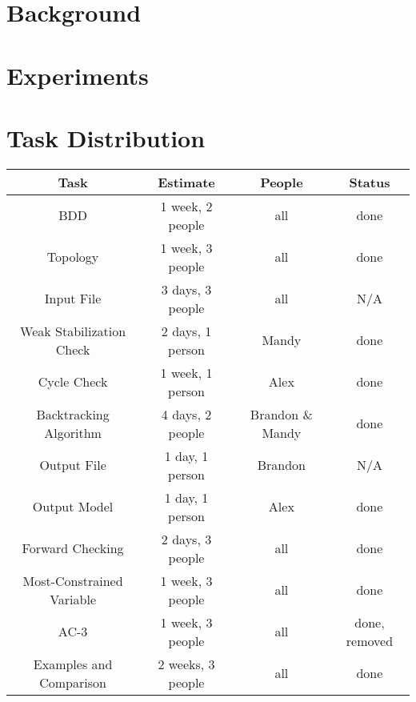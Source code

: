 
\section{Background}


\section{Experiments}

\section{Task Distribution}

\begin{center}
\begin{tabular}{|c||c|c|c|}
\hline
 Task & Estimate & People & Status \\
\hline
 BDD & 1 week, 2 people & all & done \\
 Topology & 1 week, 3 people & all & done \\
 Input File & 3 days, 3 people & all & N/A \\
 Weak Stabilization Check & 2 days, 1 person & Mandy & done \\
 Cycle Check & 1 week, 1 person & Alex & done \\
 Backtracking Algorithm & 4 days, 2 people & Brandon \& Mandy & done \\
 Output File & 1 day, 1 person &  Brandon & N/A \\
 Output Model & 1 day, 1 person & Alex & done \\
 Forward Checking & 2 days, 3 people & all & done \\
 Most-Constrained Variable & 1 week, 3 people & all & done \\
 AC-3 & 1 week, 3 people & all & done, removed \\
 Examples and Comparison & 2 weeks, 3 people & all & done \\
\hline
\end{tabular}
\end{center}

